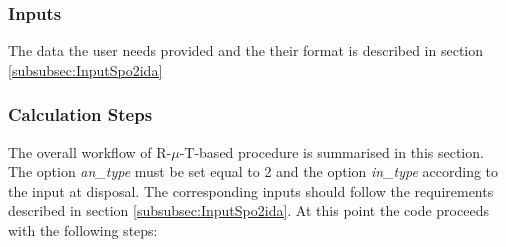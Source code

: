 \subsubsection{Inputs}
The data the user needs provided and the their format is described in section \ref{subsubsec:InputSpo2ida}

\subsubsection{Calculation Steps}
The overall workflow of R-$\mu$-T-based procedure is summarised in this section. The option \textit{an\_type} must be set equal to 2 and the option \textit{in\_type} according to the input at disposal. The corresponding inputs should follow the requirements described in section \ref{subsubsec:InputSpo2ida}. At this point the code proceeds with the following steps:

